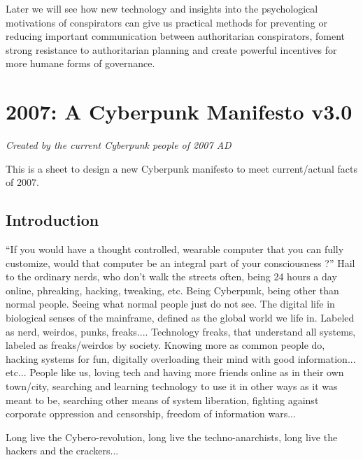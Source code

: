 \documentclass[letterpaper,12pt,english]{sphinxmanual}
\begin{document}
Later we will see how new technology and insights into the psychological motivations of conspirators can give us practical methods for preventing or reducing important communication between authoritarian conspirators, foment strong resistance to authoritarian planning and create powerful incentives for more humane forms of governance.


\chapter{2007: A Cyberpunk Manifesto v3.0}
\label{2007::doc}\label{2007:index-0}\label{2007:a-cyberpunk-manifesto-v3-0}
\emph{Created by the current Cyberpunk people of 2007 AD}

This is a sheet to design a new Cyberpunk manifesto to meet current/actual facts of 2007.


\section{Introduction}
\label{2007:introduction}
``If you would have a thought controlled, wearable computer that you can fully customize, would that computer be an integral part of your consciousness ?'' Hail to the ordinary nerds, who don't walk the streets often, being 24 hours a day online, phreaking, hacking, tweaking, etc. Being Cyberpunk, being other than normal people. Seeing what normal people just do not see. The digital life in biological senses of the mainframe, defined as the global world we life in. Labeled as nerd, weirdos, punks, freaks.... Technology freaks, that understand all systems, labeled as freaks/weirdos by society. Knowing more as common people do, hacking systems for fun, digitally overloading their mind with good information... etc... People like us, loving tech and having more friends online as in their own town/city, searching and learning technology to use it in other ways as it was meant to be, searching other means of system liberation, fighting against corporate oppression and censorship, freedom of information wars...

Long live the Cybero-revolution, long live the techno-anarchists, long live the hackers and the crackers...
\end{document}
